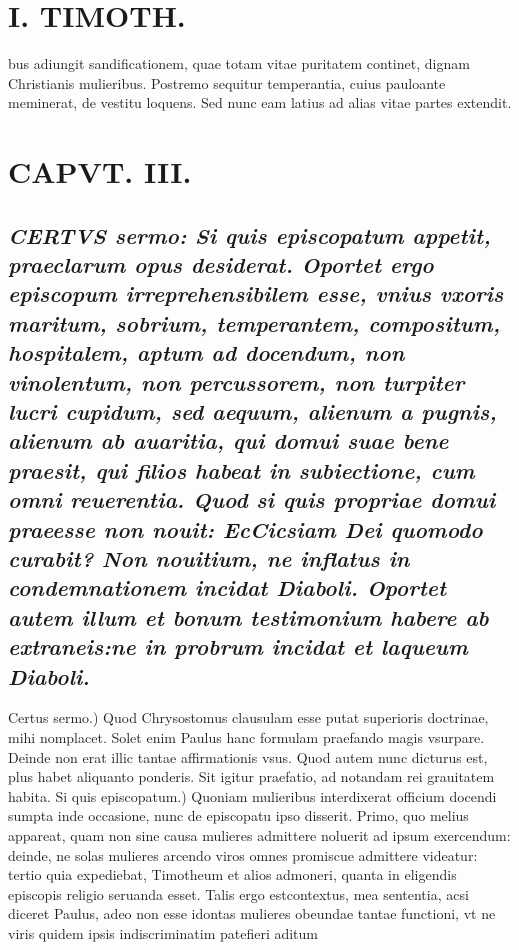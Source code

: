 \documentclass{article}
\begin{document}
\begin{pages}
\section*{I. TIMOTH. }
\marginpar{[ p.30 ]}\pstart bus adiungit sandificationem, quae totam vitae puritatem continet, dignam Christianis mulieribus. Postremo sequitur temperantia, cuius pauloante meminerat, de vestitu loquens. Sed nunc eam latius ad alias vitae partes extendit.  \pend
\endnumbering\beginnumbering\section{CAPVT. III.}
{}
\subsection*{\textit{\huge\textbf{C}\normalsize ERTVS sermo: Si quis episcopatum appetit, praeclarum opus desiderat. Oportet ergo episcopum irreprehensibilem esse, vnius vxoris maritum, sobrium, temperantem, compositum, hospitalem, aptum ad docendum, non vinolentum, non percussorem, non turpiter lucri cupidum, sed aequum, alienum a pugnis, alienum ab auaritia, qui domui suae bene praesit, qui filios habeat in subiectione, cum omni reuerentia. Quod si quis propriae domui praeesse non nouit: EcCicsiam Dei quomodo curabit? Non nouitium, ne inflatus in condemnationem incidat Diaboli. Oportet autem illum et bonum testimonium habere ab extraneis:ne in probrum incidat et laqueum Diaboli. }}\pstart Certus sermo.) Quod Chrysostomus clausulam esse putat superioris doctrinae, mihi nomplacet. Solet enim Paulus hanc formulam praefando magis vsurpare. Deinde non erat illic tantae affirmationis vsus. Quod autem nunc dicturus est, plus habet aliquanto ponderis. Sit igitur praefatio, ad notandam rei grauitatem  \pend\pstart habita. Si quis episcopatum.) Quoniam mulieribus interdixerat officium docendi sumpta inde occasione, nunc de episcopatu ipso disserit. Primo, quo melius appareat, quam non sine causa mulieres admittere noluerit ad ipsum exercendum: deinde, ne solas mulieres arcendo viros omnes promiscue admittere videatur: tertio quia expediebat, Timotheum et alios admoneri, quanta in eligendis episcopis religio seruanda esset. Talis ergo estcontextus, mea sententia, acsi diceret Paulus, adeo non esse idontas mulieres obeundae tantae functioni, vt ne viris quidem ipsis indiscriminatim patefieri aditum  \pend

\end{pages}
\end{document}
